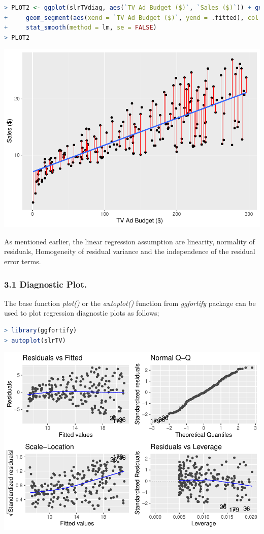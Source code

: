 \documentclass[
]{article}
\begin{document}
\begin{lstlisting}[language=R]
> PLOT2 <- ggplot(slrTVdiag, aes(`TV Ad Budget ($)`, `Sales ($)`)) + geom_point() +
+     geom_segment(aes(xend = `TV Ad Budget ($)`, yend = .fitted), col = "red", size = 0.3) +
+     stat_smooth(method = lm, se = FALSE)
> PLOT2
\end{lstlisting}

\includegraphics{LinearRegression_files/figure-latex/unnamed-chunk-15-1.pdf}

As mentioned earlier, the linear regression assumption are linearity,
normality of residuals, Homogeneity of residual variance and the
independence of the residual error terms.

\hypertarget{diagnostic-plot.}{%
\subsubsection{3.1 Diagnostic Plot.}\label{diagnostic-plot.}}

The base function \emph{plot()} or the \emph{autoplot()} function from
\emph{ggfortify} package can be used to plot regression diagnostic plots
as follows;

\begin{lstlisting}[language=R]
> library(ggfortify)
> autoplot(slrTV)
\end{lstlisting}

\includegraphics{LinearRegression_files/figure-latex/unnamed-chunk-16-1.pdf}
\end{document}
